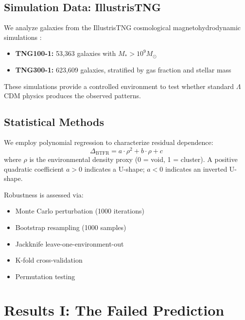 \documentclass[12pt,a4paper]{article}
\begin{document}
\subsection{Simulation Data: IllustrisTNG}

We analyze galaxies from the IllustrisTNG cosmological magnetohydrodynamic simulations \citep{Pillepich2018}:
\begin{itemize}
    \item \textbf{TNG100-1:} 53,363 galaxies with $M_* > 10^9 M_\odot$
    \item \textbf{TNG300-1:} 623,609 galaxies, stratified by gas fraction and stellar mass
\end{itemize}

These simulations provide a controlled environment to test whether standard $\Lambda$CDM physics produces the observed patterns.

\subsection{Statistical Methods}

We employ polynomial regression to characterize residual dependence:
\begin{equation}
\Delta_{\text{BTFR}} = a \cdot \rho^2 + b \cdot \rho + c
\end{equation}
where $\rho$ is the environmental density proxy (0 = void, 1 = cluster). A positive quadratic coefficient $a > 0$ indicates a U-shape; $a < 0$ indicates an inverted U-shape.

Robustness is assessed via:
\begin{itemize}
    \item Monte Carlo perturbation (1000 iterations)
    \item Bootstrap resampling (1000 samples)
    \item Jackknife leave-one-environment-out
    \item K-fold cross-validation
    \item Permutation testing
\end{itemize}

\section{Results I: The Failed Prediction}
\label{sec:failure}
\end{document}

